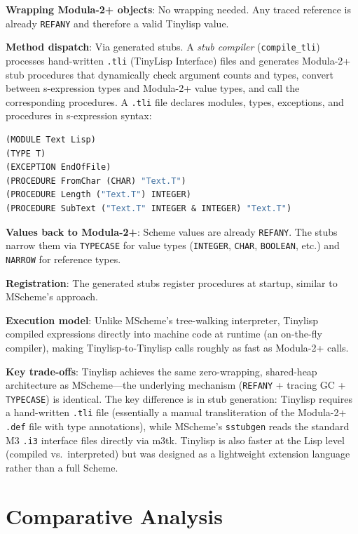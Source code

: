 \documentclass[11pt]{article}
\begin{document}
\textbf{Wrapping Modula-2+ objects}: No wrapping needed.  Any traced
reference is already \texttt{REFANY} and therefore a valid Tinylisp
value.

\textbf{Method dispatch}: Via generated stubs.  A \emph{stub compiler}
(\texttt{compile\_tli}) processes hand-written \texttt{.tli} (TinyLisp
Interface) files and generates Modula-2+ stub procedures that
dynamically check argument counts and types, convert between
s-expression types and Modula-2+ value types, and call the
corresponding procedures.  A \texttt{.tli} file declares modules,
types, exceptions, and procedures in s-expression syntax:

\begin{lstlisting}[language=Scheme]
(MODULE Text Lisp)
(TYPE T)
(EXCEPTION EndOfFile)
(PROCEDURE FromChar (CHAR) "Text.T")
(PROCEDURE Length ("Text.T") INTEGER)
(PROCEDURE SubText ("Text.T" INTEGER & INTEGER) "Text.T")
\end{lstlisting}

\textbf{Values back to Modula-2+}: Scheme values are already
\texttt{REFANY}.  The stubs narrow them via \texttt{TYPECASE} for
value types (\texttt{INTEGER}, \texttt{CHAR}, \texttt{BOOLEAN}, etc.)
and \texttt{NARROW} for reference types.

\textbf{Registration}: The generated stubs register procedures at
startup, similar to MScheme's approach.

\textbf{Execution model}: Unlike MScheme's tree-walking interpreter,
Tinylisp compiled expressions directly into machine code at runtime
(an on-the-fly compiler), making Tinylisp-to-Tinylisp calls roughly
as fast as Modula-2+ calls.

\textbf{Key trade-offs}: Tinylisp achieves the same zero-wrapping,
shared-heap architecture as MScheme---the underlying mechanism
(\texttt{REFANY} + tracing GC + \texttt{TYPECASE}) is identical.  The
key difference is in stub generation: Tinylisp requires a hand-written
\texttt{.tli} file (essentially a manual transliteration of the
Modula-2+ \texttt{.def} file with type annotations), while MScheme's
\texttt{sstubgen} reads the standard M3 \texttt{.i3} interface files
directly via m3tk.  Tinylisp is also faster at the Lisp level
(compiled vs.\ interpreted) but was designed as a lightweight extension
language rather than a full Scheme.


\section{Comparative Analysis}
\label{sec:analysis}
\end{document}
